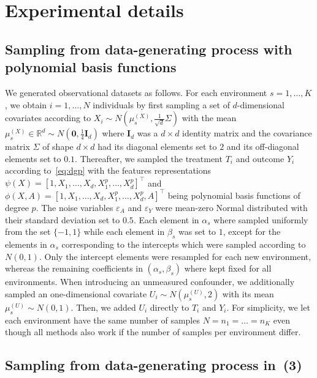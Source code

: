 \documentclass{article}
\begin{document}
\section{Experimental details}

\subsection{Sampling from data-generating process with polynomial basis functions} \label{app:synthetic_data} 
We generated observational datasets as follows. For each environment $s=1,\dots, K$, we obtain $i=1,
\dots, N$ individuals by first sampling a set of $d$-dimensional covariates according to $X_i\sim N(\mu_s^{(X)}, \frac{1}{\sqrt{d}}\Sigma)$ with the mean $\mu_s^{(X)}\in\mathbb{R}^d\sim N(\mathbf{0}, \frac{1}{4}\mathbf{I}_d)$ where $\mathbf{I}_d$ was a $d\times d$ identity matrix and the covariance matrix $\Sigma$ of shape $d\times d$ had its diagonal elements set to $2$ and its off-diagonal elements set to $0.1$. Thereafter, we sampled the treatment $T_i$ and outcome $Y_i$ according to~\eqref{eq:dgp} with the features representations $\psi(X) = [1, X_1, \dots, X_d, X_1^p, \dots, X_d^p]^\top$ and $\phi(X,A) = [1, X_1, \dots, X_d, X_1^p, \dots, X_d^p, A]^\top$ being polynomial basis functions of degree $p$. The noise variables $\varepsilon_A$ and $\varepsilon_Y$ were mean-zero Normal distributed with their standard deviation set to $0.5$. Each element in $\alpha_s$ where sampled uniformly from the set $\{-1,1\}$ while each element in $\beta_s$ was set to $1$, except for the elements in $\alpha_s$ corresponding to the intercepts which were sampled according to $N(0,1)$. Only the intercept elements were resampled for each new environment, whereas the remaining coefficients in $(\alpha_s,\beta_s)$ where kept fixed for all environments. When introducing an unmeasured confounder, we additionally sampled an one-dimensional covariate $U_i\sim N(\mu_s^{(U)}, 2)$ with its mean $\mu_s^{(U)}\sim N(0,1)$. Then, we added $U_i$ directly to $T_i$ and $Y_i$. For simplicity, we let each environment have the same number of samples $N=n_1=\dots=n_K$ even though all methods also work if the number of samples per environment differ.

\subsection{Sampling from data-generating process in~(3)} \label{app:linear_example_data}
\end{document}
